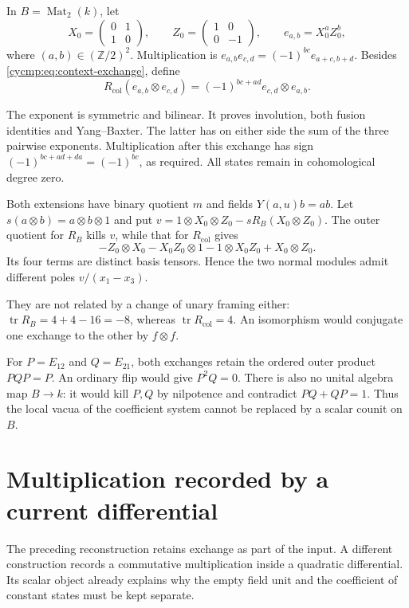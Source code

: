 \begin{example}\label{cycmp:ex:matrix-exchanges}
In $B=\operatorname{Mat}_2(k)$, let
\[
 X_0=\begin{pmatrix}0&1\\1&0\end{pmatrix},\qquad
 Z_0=\begin{pmatrix}1&0\\0&-1\end{pmatrix},\qquad
 e_{a,b}=X_0^aZ_0^b,
\]
where $(a,b)\in(\mathbb Z/2)^2$. Multiplication is
$e_{a,b}e_{c,d}=(-1)^{bc}e_{a+c,b+d}$.
Besides \eqref{cycmp:eq:context-exchange}, define
\[
 R_{\mathrm{col}}(e_{a,b}\otimes e_{c,d})
       =(-1)^{bc+ad}e_{c,d}\otimes e_{a,b}.
\]

The exponent is symmetric and bilinear. It proves involution, both
fusion identities and Yang--Baxter. The latter has on either side
the sum of the three pairwise exponents. Multiplication after this
exchange has sign $(-1)^{bc+ad+da}=(-1)^{bc}$, as required.
All states remain in cohomological degree zero.

Both extensions have binary quotient $m$ and fields $Y(a,u)b=ab$.
Let $s(a\otimes b)=a\otimes b\otimes1$ and put
$v=1\otimes X_0\otimes Z_0-sR_B(X_0\otimes Z_0)$.
The outer quotient for $R_B$ kills $v$, while that for
$R_{\mathrm{col}}$ gives
\[
 -Z_0\otimes X_0-X_0Z_0\otimes1-1\otimes X_0Z_0+X_0\otimes Z_0.
\]
Its four terms are distinct basis tensors. Hence the two normal
modules admit different poles $v/(x_1-x_3)$.

They are not related by a change of unary framing either:
$\operatorname{tr}R_B=4+4-16=-8$, whereas
$\operatorname{tr}R_{\mathrm{col}}=4$. An isomorphism would conjugate
one exchange to the other by $f\otimes f$.

For $P=E_{12}$ and $Q=E_{21}$, both exchanges retain the ordered
outer product $PQP=P$. An ordinary flip would give $P^2Q=0$.
There is also no unital algebra map $B\to k$: it would kill $P,Q$
by nilpotence and contradict $PQ+QP=1$. Thus the local vacua of
the coefficient system cannot be replaced by a scalar counit on $B$.
\end{example}

\section{Multiplication recorded by a current differential}
\label{cycmp:sec:currents}

The preceding reconstruction retains exchange as part of the input.
A different construction records a commutative multiplication inside
a quadratic differential. Its scalar object already explains why the
empty field unit and the coefficient of constant states must be kept
separate.

